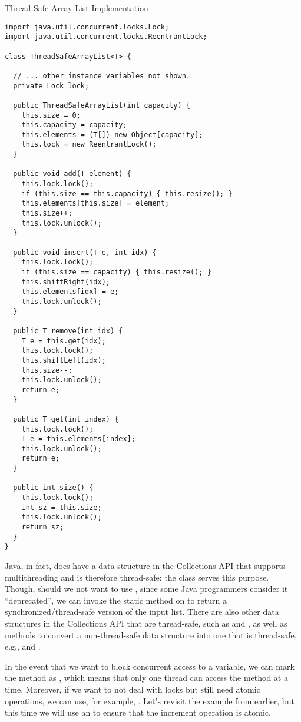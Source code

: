 \begin{cl}{Thread-Safe Array List Implementation}
\begin{lstlisting}[language=MyJava]
import java.util.concurrent.locks.Lock;
import java.util.concurrent.locks.ReentrantLock;

class ThreadSafeArrayList<T> {

  // ... other instance variables not shown.
  private Lock lock;

  public ThreadSafeArrayList(int capacity) {
    this.size = 0;
    this.capacity = capacity;
    this.elements = (T[]) new Object[capacity];
    this.lock = new ReentrantLock();
  }

  public void add(T element) {
    this.lock.lock();
    if (this.size == this.capacity) { this.resize(); }
    this.elements[this.size] = element;
    this.size++;
    this.lock.unlock();
  }

  public void insert(T e, int idx) {
    this.lock.lock();
    if (this.size == capacity) { this.resize(); }
    this.shiftRight(idx);
    this.elements[idx] = e;
    this.lock.unlock();
  }

  public T remove(int idx) {
    T e = this.get(idx);
    this.lock.lock();
    this.shiftLeft(idx);
    this.size--;
    this.lock.unlock();
    return e;
  }

  public T get(int index) {
    this.lock.lock();
    T e = this.elements[index];
    this.lock.unlock();
    return e;
  }

  public int size() {
    this.lock.lock();
    int sz = this.size;
    this.lock.unlock();
    return sz;
  }
}
\end{lstlisting}
\end{cl}

Java, in fact, does have a data structure in the Collections API that supports multithreading and is therefore thread-safe: the  class serves this purpose. Though, should we not want to use , since some Java programmers consider it ``deprecated'', we can invoke the static  method on  to return a synchronized/thread-safe version of the input list. There are also other data structures in the Collections API that are thread-safe, such as  and , as well as methods to convert a non-thread-safe data structure into one that is thread-safe, e.g.,  and .

\example In the event that we want to block concurrent access to a variable, we can mark the method as , which means that only one thread can access the method at a time. Moreover, if we want to not deal with locks but still need atomic operations, we can use, for example, . Let's revisit the  example from earlier, but this time we will use an  to ensure that the increment operation is atomic.

